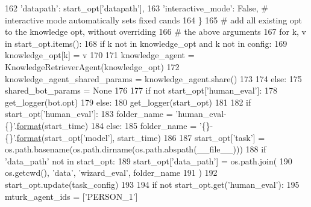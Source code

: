 \begin{DoxyCode}
{{{{162             \textcolor{stringliteral}{'datapath'}: start\_opt[\textcolor{stringliteral}{'datapath'}],
163             \textcolor{stringliteral}{'interactive\_mode'}: \textcolor{keyword}{False},  \textcolor{comment}{# interactive mode automatically sets fixed cands}
164         \}
165         \textcolor{comment}{# add all existing opt to the knowledge opt, without overriding}
166         \textcolor{comment}{# the above arguments}
167         \textcolor{keywordflow}{for} k, v \textcolor{keywordflow}{in} start\_opt.items():
168             \textcolor{keywordflow}{if} k \textcolor{keywordflow}{not} \textcolor{keywordflow}{in} knowledge\_opt \textcolor{keywordflow}{and} k \textcolor{keywordflow}{not} \textcolor{keywordflow}{in} config:
169                 knowledge\_opt[k] = v
170 
171         knowledge\_agent = KnowledgeRetrieverAgent(knowledge\_opt)
172         knowledge\_agent\_shared\_params = knowledge\_agent.share()
173 
174     \textcolor{keywordflow}{else}:
175         shared\_bot\_params = \textcolor{keywordtype}{None}
176 
177     \textcolor{keywordflow}{if} \textcolor{keywordflow}{not} start\_opt[\textcolor{stringliteral}{'human\_eval'}]:
178         get\_logger(bot.opt)
179     \textcolor{keywordflow}{else}:
180         get\_logger(start\_opt)
181 
182     \textcolor{keywordflow}{if} start\_opt[\textcolor{stringliteral}{'human\_eval'}]:
183         folder\_name = \textcolor{stringliteral}{'human\_eval-\{\}'}.\hyperlink{namespaceparlai_1_1chat__service_1_1services_1_1messenger_1_1shared__utils_a32e2e2022b824fbaf80c747160b52a76}{format}(start\_time)
184     \textcolor{keywordflow}{else}:
185         folder\_name = \textcolor{stringliteral}{'\{\}-\{\}'}.\hyperlink{namespaceparlai_1_1chat__service_1_1services_1_1messenger_1_1shared__utils_a32e2e2022b824fbaf80c747160b52a76}{format}(start\_opt[\textcolor{stringliteral}{'model'}], start\_time)
186 
187     start\_opt[\textcolor{stringliteral}{'task'}] = os.path.basename(os.path.dirname(os.path.abspath(\_\_file\_\_)))
188     \textcolor{keywordflow}{if} \textcolor{stringliteral}{'data\_path'} \textcolor{keywordflow}{not} \textcolor{keywordflow}{in} start\_opt:
189         start\_opt[\textcolor{stringliteral}{'data\_path'}] = os.path.join(
190             os.getcwd(), \textcolor{stringliteral}{'data'}, \textcolor{stringliteral}{'wizard\_eval'}, folder\_name
191         )
192     start\_opt.update(task\_config)
193 
194     \textcolor{keywordflow}{if} \textcolor{keywordflow}{not} start\_opt.get(\textcolor{stringliteral}{'human\_eval'}):
195         mturk\_agent\_ids = [\textcolor{stringliteral}{'PERSON\_1'}]
}}}}
\end{DoxyCode}

